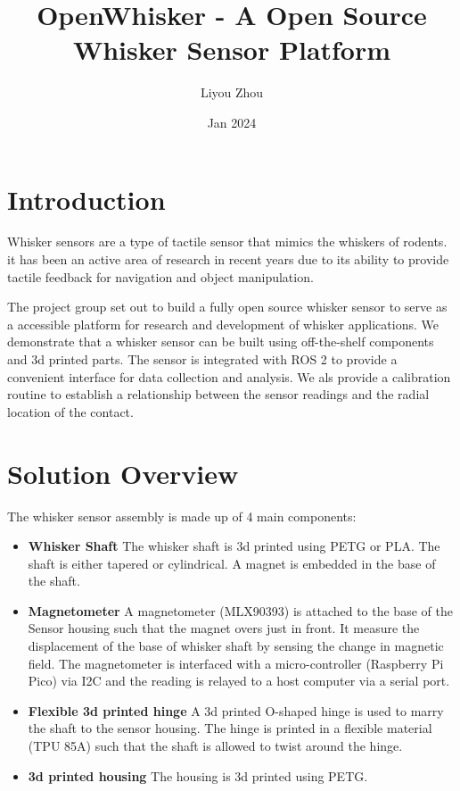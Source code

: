 \documentclass{article}
\title{OpenWhisker - A Open Source Whisker Sensor Platform}
\author{Liyou Zhou}
\date{Jan 2024}
\begin{document}
\maketitle

\section{Introduction}

Whisker sensors are a type of tactile sensor that mimics the whiskers of rodents. it has been an active area of research in recent years due to its ability to provide tactile feedback for navigation and object manipulation.

The project group set out to build a fully open source whisker sensor to serve as a accessible platform for research and development of whisker applications. We demonstrate that a whisker sensor can be built using off-the-shelf components and 3d printed parts. The sensor is integrated with ROS 2 to provide a convenient interface for data collection and analysis. We als provide a calibration routine to establish a relationship between the sensor readings and the radial location of the contact.

\section{Solution Overview}

The whisker sensor assembly is made up of 4 main components:
\begin{itemize}
    \item \textbf{Whisker Shaft} The whisker shaft is 3d printed using PETG or PLA. The shaft is either tapered or cylindrical. A magnet is embedded in the base of the shaft.
    \item \textbf{Magnetometer} A magnetometer (MLX90393) is attached to the base of the Sensor housing such that the magnet overs just in front. It measure the displacement of the base of whisker shaft by sensing the change in magnetic field. The magnetometer is interfaced with a micro-controller (Raspberry Pi Pico) via I2C and the reading is relayed to a host computer via a serial port.
    \item \textbf{Flexible 3d printed hinge} A 3d printed O-shaped hinge is used to marry the shaft to the sensor housing. The hinge is printed in a flexible material (TPU 85A) such that the shaft is allowed to twist around the hinge.
    \item \textbf{3d printed housing} The housing is 3d printed using PETG.
\end{itemize}
\end{document}
